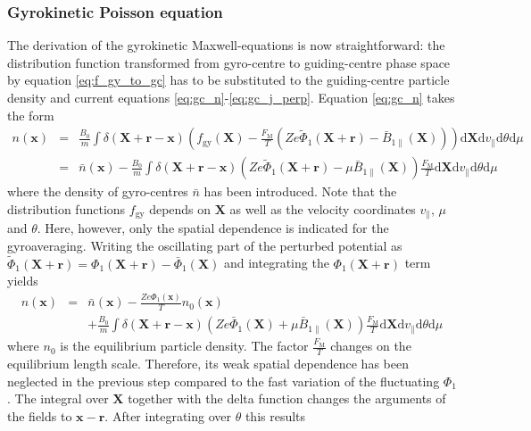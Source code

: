 \documentclass[a4paper,10pt]{article}
\newcommand{\st}[1]{\mathrm{#1}} %
\renewcommand{\vec}[1]{\mathbf{#1}}
\begin{document}
\subsubsection{Gyrokinetic Poisson equation}
The derivation of the gyrokinetic Maxwell-equations is now straightforward: the distribution function transformed from gyro-centre to guiding-centre phase space by equation \ref{eq:f_gy_to_gc} has to be substituted to the guiding-centre particle density and current equations \ref{eq:gc_n}-\ref{eq:gc_j_perp}. Equation \ref{eq:gc_n} takes the form
\begin{eqnarray*}
	n(\vec{x}) &=& \frac{B_0}{m} \int \delta(\vec{X}+\vec{r}-\vec{x}) \left( f_{\st{gy}}(\vec{X}) - \frac{F_{\st{M}}}{T} \left( Z e \widetilde{\Phi}_1(\vec{X}+\vec{r}) - \bar{B}_{1 \parallel}(\vec{X}) \right)\right) \mathrm{d}\mathbf{X} \mathrm{d}v_{\parallel} \mathrm{d} \theta \mathrm{d}\mu \\
	&=& \bar{n}(\vec{x}) - \frac{B_0}{m} \int \delta(\vec{X}+\vec{r}-\vec{x}) \left( Z e \widetilde{\Phi}_1(\vec{X}+\vec{r}) - \mu \bar{B}_{1 \parallel}(\vec{X}) \right) \frac{F_{\st{M}}}{T} \mathrm{d}\mathbf{X} \mathrm{d}v_{\parallel} \mathrm{d} \theta \mathrm{d}\mu
\end{eqnarray*}
where the density of gyro-centres $\bar{n}$ has been introduced. Note that the distribution functions $f_{\st{gy}}$ depends on $\vec{X}$ as well as the velocity coordinates $v_{\parallel}$, $\mu$ and $\theta$. Here, however, only the spatial dependence is indicated for the gyroaveraging. Writing the oscillating part of the perturbed potential as $\widetilde{\Phi}_1(\vec{X}+\vec{r}) = \Phi_1(\vec{X}+\vec{r}) - \bar{\Phi}_1(\vec{X})$ and integrating the $\Phi_1(\vec{X}+\vec{r})$ term yields
\begin{eqnarray*}
	n(\vec{x}) &=& \bar{n}(\vec{x}) - \frac{ Z e \Phi_1(\vec{x})}{T} n_0(\vec{x}) \\
	&& + \frac{B_0}{m} \int \delta(\vec{X}+\vec{r}-\vec{x}) \left( Z e \bar{\Phi}_1(\vec{X}) + \mu \bar{B}_{1 \parallel}(\vec{X}) \right) \frac{F_{\st{M}}}{T} \mathrm{d}\mathbf{X} \mathrm{d}v_{\parallel} \mathrm{d} \theta \mathrm{d}\mu
\end{eqnarray*}
where $n_0$ is the equilibrium particle density. The factor $\frac{F_{\st{M}}}{T}$ changes on the equilibrium length scale. Therefore, its weak spatial dependence has been neglected in the previous step compared to the fast variation of the fluctuating $\Phi_1$. 
The integral over $\vec{X}$ together with the delta function changes the arguments of the fields to $\vec{x}-\vec{r}$. After integrating over $\theta$ this results
\end{document}
